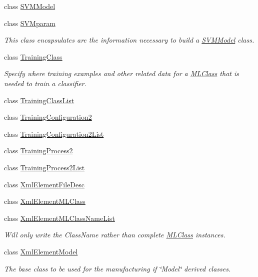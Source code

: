 \begin{DoxyCompactItemize}
class \hyperlink{class_k_k_m_l_l_1_1_s_v_m_model}{S\+V\+M\+Model}
\item 
class \hyperlink{class_k_k_m_l_l_1_1_s_v_mparam}{S\+V\+Mparam}
\begin{DoxyCompactList}\small\item\em This class encapsulates are the information necessary to build a \hyperlink{class_k_k_m_l_l_1_1_s_v_m_model}{S\+V\+M\+Model} class. \end{DoxyCompactList}\item 
class \hyperlink{class_k_k_m_l_l_1_1_training_class}{Training\+Class}
\begin{DoxyCompactList}\small\item\em Specify where training examples and other related data for a \hyperlink{class_k_k_m_l_l_1_1_m_l_class}{M\+L\+Class} that is needed to train a classifier. \end{DoxyCompactList}\item 
class \hyperlink{class_k_k_m_l_l_1_1_training_class_list}{Training\+Class\+List}
\item 
class \hyperlink{class_k_k_m_l_l_1_1_training_configuration2}{Training\+Configuration2}
\item 
class \hyperlink{class_k_k_m_l_l_1_1_training_configuration2_list}{Training\+Configuration2\+List}
\item 
class \hyperlink{class_k_k_m_l_l_1_1_training_process2}{Training\+Process2}
\item 
class \hyperlink{class_k_k_m_l_l_1_1_training_process2_list}{Training\+Process2\+List}
\item 
class \hyperlink{class_k_k_m_l_l_1_1_xml_element_file_desc}{Xml\+Element\+File\+Desc}
\item 
class \hyperlink{class_k_k_m_l_l_1_1_xml_element_m_l_class}{Xml\+Element\+M\+L\+Class}
\item 
class \hyperlink{class_k_k_m_l_l_1_1_xml_element_m_l_class_name_list}{Xml\+Element\+M\+L\+Class\+Name\+List}
\begin{DoxyCompactList}\small\item\em Will only write the Class\+Name rather than complete \hyperlink{class_k_k_m_l_l_1_1_m_l_class}{M\+L\+Class} instances. \end{DoxyCompactList}\item 
class \hyperlink{class_k_k_m_l_l_1_1_xml_element_model}{Xml\+Element\+Model}
\begin{DoxyCompactList}\small\item\em The base class to be used for the manufacturing if \char`\"{}\+Model\char`\"{} derived classes. \end{DoxyCompactList}\item 

\end{DoxyCompactItemize}
